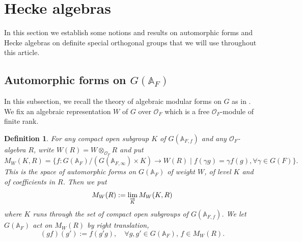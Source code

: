 \documentclass[12pt,oneside,reqno]{amsart}
\theoremstyle{plain}
\newtheorem{definition}[theorem]{Definition}
\begin{document}
	
	
	
	
	
	
	
	
	
	
	
	
	\section{Hecke algebras}\label{Hecke algebras and rep}	
	In this section we
	establish some notions and results on
	automorphic forms and Hecke algebras
	on definite special orthogonal groups that we will use throughout this article.
	
	
	
	
	
	
	
	
	
	
	
	
	
	\subsection{Automorphic forms on $G(\mathbb{A}_F)$}\label{Automorphic forms on G(A_F)}
	In this subsection, we recall the theory of
	algebraic modular forms on $G$
	as in \cite[§4]{Gross1999}.
	We fix an algebraic representation
	$W$ of $ G$ over $\mathcal{O}_F$
	which is a free $\mathcal{O}_F$-module of finite rank.
	
	
	
	
	
	
	
	\begin{definition}
		For any compact open subgroup $K$ of $G(\mathbb{A}_{F,f})$ and any $\mathcal{O}_F$-algebra $R$, write $W(R)=W\otimes_{\mathcal{O}_F}R$ and put
		\[
		M_W(K,R)
		=
		\{
		f\colon
		G(\mathbb{A}_F)/(G(\mathbb{A}_{F,\infty})\times K)
		\rightarrow
		W(R)\mid 
		f(\gamma g)=\gamma f(g),
		\forall
		\gamma\in
		G(F)
		\}.
		\]
		This is the space of automorphic forms on $G(\mathbb{A}_F)$ of weight $W$, of level $K$ and of coefficients in $R$. Then we put
		\[
		M_W(R):=
		\lim\limits_{\overrightarrow{K}}
		M_W(K,R)\index{M@$M_W(K,R),M_W(R)$}
		\]
		where $K$ runs through the set of compact open subgroups of	$G(\mathbb{A}_{F,f})$. We let $G(\mathbb{A}_F)$ act on $M_W(R)$
		by right translation,
		\[
		(gf)(g'):=
		f(g'g),
		\quad
		\forall
		g,g'\in G(\mathbb{A}_F),
		\,
		f\in M_W(R).
		\]
	\end{definition}
	
	
	
\end{document}
